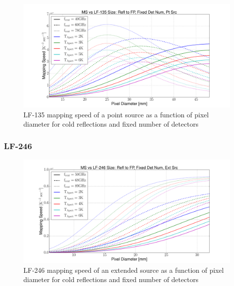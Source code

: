 \documentclass[12pt, titlepage]{article} %
\begin{document}
\begin{figure}[H]
	\centering
	\includegraphics[width=1.1\textwidth, center]{PDF/LFT_MS_LF-135_coldRefl_fixDetNum_ptSrc.pdf}
	\caption{LF-135 mapping speed of a point source as a function of pixel diameter for cold reflections and fixed number of detectors}
\end{figure}


\subsubsection{LF-246}

\begin{figure}[H]
	\centering
	\includegraphics[width=1.1\textwidth, center]{PDF/LFT_MS_LF-246_coldRefl_fixDetNum_extSrc.pdf}
	\caption{LF-246 mapping speed of an extended source as a function of pixel diameter for cold reflections and fixed number of detectors}
\end{figure}
\end{document}
